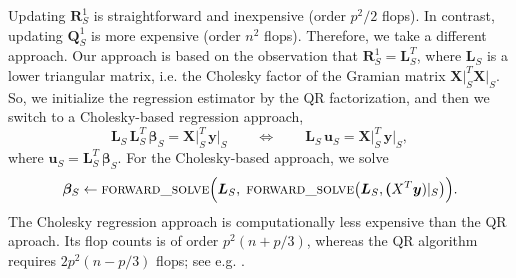 \documentclass[a4paper,oneside,11pt,DIV=12]{scrartcl}
\begin{document}
Updating $\bm R_S^1$ is straightforward and inexpensive (order $p^2/2$
flops). In contrast, updating $\bm Q_S^1$ is more expensive
(order $n^2$ flops). Therefore, we take a different approach. Our approach
is based on the observation that $\bm R_S^1 = \bm L_S^T$, where $\bm L_S$
is a lower triangular matrix, i.e. the Cholesky factor of the Gramian
matrix $\bm X\vert_S^T \bm X \vert_S$. So, we initialize the regression
estimator by the QR factorization, and then we switch to a
Cholesky-based regression approach,
\begin{equation*}
	\bm L_S \, \bm L_S^T \, \bm \beta_S = \bm X\vert_S^T \, \bm y\vert_S
		\qquad \Longleftrightarrow \qquad \bm L_S \, \bm u_S =
		\bm X\vert_S^T \, \bm y\vert_S,
\end{equation*}
\noindent where $\bm u_S = \bm L_S^T \, \bm \beta_S$. For the Cholesky-based
approach, we solve
\begin{equation}\label{eq:chol_reg}
	\bm \beta_S \gets \text{\textsc{forward\_solve}}\Big(\bm L_S, \;
		\text{\textsc{forward\_solve}}\big(\bm L_S, \bm (X^T \bm y)
		\vert_S\big)\Big).
\end{equation}
\noindent The Cholesky regression approach is computationally less
 expensive than the QR aproach. Its flop counts is of order $p^2(n + p/3)$,
whereas the QR algorithm requires $2p^2(n-p/3)$ flops; see e.g.
\citet[][Chap. 5.3]{golub_loan_1996}.
\end{document}
